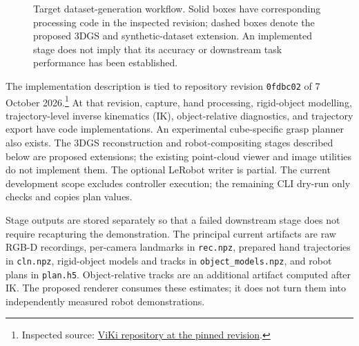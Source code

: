 \begin{figure}[htbp]
\centering
{}
\caption{Target dataset-generation workflow. Solid boxes have corresponding
processing code in the inspected revision; dashed boxes denote the proposed
3DGS and synthetic-dataset extension. An implemented stage does not imply
that its accuracy or downstream task performance has been established.}
\label{fig:pipeline}
\end{figure}

The implementation description is tied to repository revision
\texttt{0fdbc02} of 7 October 2026.\footnote{Inspected source:
\href{https://github.com/artyomzifir/ViKi/tree/0fdbc02f8f68d82322d32fa9151097034593d30c}{ViKi repository at the pinned revision}.}
At that revision, capture, hand processing, rigid-object modelling,
trajectory-level inverse kinematics (IK), object-relative diagnostics, and
trajectory export have code implementations. An experimental cube-specific
grasp planner also exists. The 3DGS reconstruction and robot-compositing
stages described below are proposed extensions; the existing point-cloud
viewer and image utilities do not implement them. The optional LeRobot
writer is partial. The current development scope excludes controller execution;
the remaining CLI dry-run only checks and copies plan values.

Stage outputs are stored separately so that a failed downstream stage does
not require recapturing the demonstration. The principal current artifacts
are raw RGB-D recordings, per-camera landmarks in \texttt{rec.npz}, prepared
hand trajectories in \texttt{cln.npz}, rigid-object models and tracks in
\texttt{object\_models.npz}, and robot plans in \texttt{plan.h5}.
Object-relative tracks are an additional artifact computed after IK.
The proposed renderer consumes these estimates; it does not turn them into
independently measured robot demonstrations.

